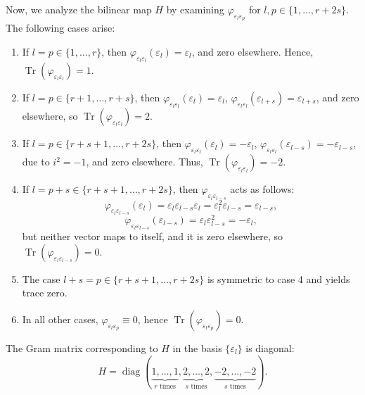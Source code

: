 \documentclass{amsart}
\begin{document}
Now, we analyze the bilinear map $H$ by examining $\varphi_{\varepsilon_l \varepsilon_p}$ for $l, p \in \{1, \ldots, r+2s\}$. The following cases arise:
\begin{enumerate}
    \item If $l = p \in \{1, \ldots, r\}$, then $\varphi_{\varepsilon_l \varepsilon_l}(\varepsilon_l) = \varepsilon_l$, and zero elsewhere. Hence, $\operatorname{Tr}(\varphi_{\varepsilon_l \varepsilon_l}) = 1$.
    
    \item If $l = p \in \{r+1, \ldots, r+s\}$, then $\varphi_{\varepsilon_l \varepsilon_l}(\varepsilon_l) = \varepsilon_l$, $\varphi_{\varepsilon_l \varepsilon_l}(\varepsilon_{l+s}) = \varepsilon_{l+s}$, and zero elsewhere, so $\operatorname{Tr}(\varphi_{\varepsilon_l \varepsilon_l}) = 2$.
    
    \item If $l = p \in \{r+s+1, \ldots, r+2s\}$, then $\varphi_{\varepsilon_l \varepsilon_l}(\varepsilon_l) = -\varepsilon_l$, $\varphi_{\varepsilon_l \varepsilon_l}(\varepsilon_{l-s}) = -\varepsilon_{l-s}$, due to $i^2 = -1$, and zero elsewhere. Thus, $\operatorname{Tr}(\varphi_{\varepsilon_l \varepsilon_l}) = -2$.
    
    \item If $l = p + s \in \{r+s+1, \ldots, r+2s\}$, then $\varphi_{\varepsilon_l \varepsilon_{l-s}}$ acts as follows:
    \[
    \varphi_{\varepsilon_l \varepsilon_{l-s}}(\varepsilon_l) = \varepsilon_l \varepsilon_{l-s} \varepsilon_l = \varepsilon_l^2 \varepsilon_{l-s} = \varepsilon_{l-s}, 
    \]
    \[
    \varphi_{\varepsilon_l \varepsilon_{l-s}}(\varepsilon_{l-s}) = \varepsilon_l \varepsilon_{l-s}^2 = -\varepsilon_l,
    \]
    but neither vector maps to itself, and it is zero elsewhere, so $\operatorname{Tr}(\varphi_{\varepsilon_l \varepsilon_{l-s}}) = 0$.
    
    \item The case $l + s = p \in \{r+s+1, \ldots, r+2s\}$ is symmetric to case 4 and yields trace zero.
    
    \item In all other cases, $\varphi_{\varepsilon_l \varepsilon_p} \equiv 0$, hence $\operatorname{Tr}(\varphi_{\varepsilon_l \varepsilon_p}) = 0$.
\end{enumerate}

The Gram matrix corresponding to $H$ in the basis $\{\varepsilon_l\}$ is diagonal:
\[
H = \operatorname{diag}(\underbrace{1, \dots, 1}_{r\text{ times}}, 
                         \underbrace{2, \dots, 2}_{s\text{ times}}, 
                         \underbrace{-2, \dots, -2}_{s\text{ times}}).
\]
\end{document}
